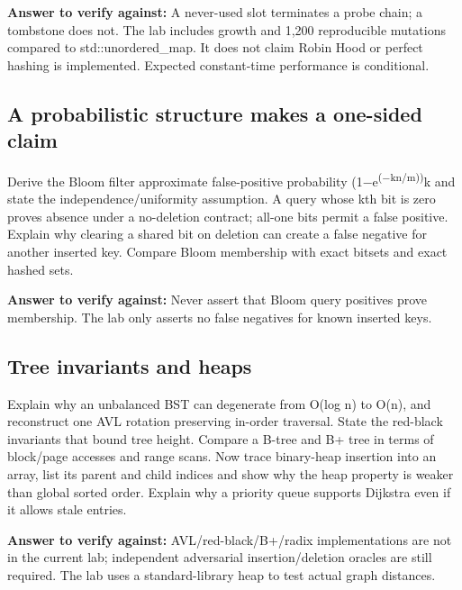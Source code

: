 \textbf{Answer to verify against:} A never-used slot terminates a probe chain; a tombstone does not. The lab includes growth and 1,200 reproducible mutations compared to std::unordered\_map. It does not claim Robin Hood or perfect hashing is implemented. Expected constant-time performance is conditional.

\subsection{A probabilistic structure makes a one-sided claim}\label{appendix-8a046b38375e-a-probabilistic-structure-makes-a-one-sided-claim}

\hypertarget{appendix-8a046b38375e-a-probabilistic-structure-makes-a-one-sided-claim}{}

Derive the Bloom filter approximate false-positive probability (1−e\textsuperscript{(−kn/m))}k and state the independence/uniformity assumption. A query whose kth bit is zero proves absence under a no-deletion contract; all-one bits permit a false positive. Explain why clearing a shared bit on deletion can create a false negative for another inserted key. Compare Bloom membership with exact bitsets and exact hashed sets.

\textbf{Answer to verify against:} Never assert that Bloom query positives prove membership. The lab only asserts no false negatives for known inserted keys.

\subsection{Tree invariants and heaps}\label{appendix-8a046b38375e-tree-invariants-and-heaps}

\hypertarget{appendix-8a046b38375e-tree-invariants-and-heaps}{}

Explain why an unbalanced BST can degenerate from O(log n) to O(n), and reconstruct one AVL rotation preserving in-order traversal. State the red-black invariants that bound tree height. Compare a B-tree and B+ tree in terms of block/page accesses and range scans. Now trace binary-heap insertion into an array, list its parent and child indices and show why the heap property is weaker than global sorted order. Explain why a priority queue supports Dijkstra even if it allows stale entries.

\textbf{Answer to verify against:} AVL/red-black/B+/radix implementations are not in the current lab; independent adversarial insertion/deletion oracles are still required. The lab uses a standard-library heap to test actual graph distances.

